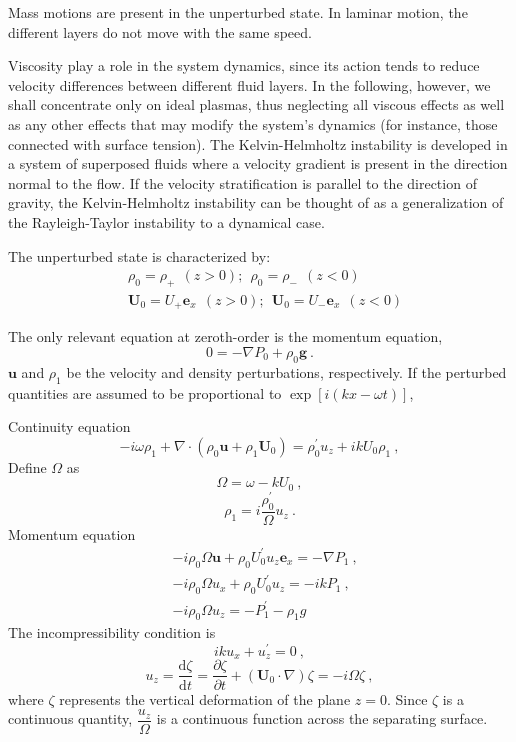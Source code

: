 \documentclass[12pt,a4paper]{article}
\renewcommand{\vec}[1]{\boldsymbol{#1}}
\newcommand{\dif}{\mathrm{d}}
\begin{document}
Mass motions are present in the unperturbed state. In laminar motion, the different layers do not move with the same speed. 

Viscosity play a role in the system dynamics, since its action tends to reduce velocity differences between different fluid layers. In the following, however, we shall concentrate only on ideal plasmas, thus neglecting all viscous effects as well as any other effects that may modify the system’s dynamics (for instance, those connected with surface tension). The Kelvin-Helmholtz instability is developed in a system of superposed fluids where a velocity gradient is present in the direction normal to the flow. If the velocity stratification is parallel to the direction of gravity, the Kelvin-Helmholtz instability can be thought of as a generalization of the Rayleigh-Taylor instability to a dynamical case.

The unperturbed state is characterized by:
\begin{align*}
& \rho_0 = \rho_+ ~~(z > 0) ; ~~ \rho_0 = \rho_- ~~(z < 0) \\
& \vec{U}_0 = U_+ \vec{e}_x ~~(z > 0) ; ~~ \vec{U}_0 = U_- \vec{e}_x ~~(z < 0)
\end{align*}

The only relevant equation at zeroth-order is the momentum equation, 
\begin{equation*}
0 = -\nabla P_0 +\rho_0 \vec{g} ~.
\end{equation*}
$\vec{u}$ and $\rho_1$ be the velocity and density perturbations, respectively. If the perturbed quantities are assumed to be proportional to $\exp[i (kx -\omega t)]$, 

Continuity equation
\begin{equation*}
-i\omega \rho_1 +\nabla\cdot (\rho_0 \vec{u} +\rho_1 \vec{U}_0) = \rho_0^\prime u_z +ik U_0 \rho_1 ~,
\end{equation*}
Define $\Omega$ as
\begin{equation*}
\Omega = \omega -kU_0 ~,
\end{equation*}
\begin{equation*}
\rho_1 = i \frac{\rho_0^\prime}{\Omega} u_z ~.
\end{equation*}
Momentum equation
\begin{align*}
& -i\rho_0 \Omega \vec{u} +\rho_0 U_0^\prime u_z \vec{e}_x = -\nabla P_1 ~, \\
& -i\rho_0 \Omega u_x +\rho_0 U_0^\prime u_z = -ikP_1 ~, \\
& -i\rho_0 \Omega u_z = -P_1^\prime -\rho_1 g
\end{align*}
The incompressibility condition is
\begin{equation*}
iku_x +u_z^\prime = 0 ~,
\end{equation*}
\begin{equation*}
u_z = \frac{\dif \zeta}{\dif t} = \frac{\partial \zeta}{\partial t} +(\vec{U}_0 \cdot \nabla) \zeta = -i\Omega \zeta ~,
\end{equation*}
where $\zeta$ represents the vertical deformation of the plane $z = 0$. Since $\zeta$ is a continuous quantity, $\dfrac{u_z}{\Omega}$ is a continuous function across the separating surface.
\end{document}
